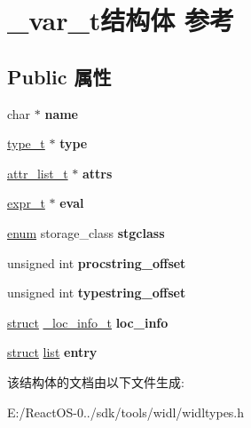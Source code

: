 \hypertarget{struct__var__t}{}\section{\+\_\+var\+\_\+t结构体 参考}
\label{struct__var__t}
\subsection*{Public 属性}
\begin{DoxyCompactItemize}
\item 
\mbox{\label{struct__var__t_a0b690bbf506b5e6ad9f3d3c79602a028}} 
char $\ast$ {\bfseries name}
\item 
\mbox{\label{struct__var__t_a0aa23f34dd67d227583185602d967ec6}} 
\hyperlink{struct__type__t}{type\+\_\+t} $\ast$ {\bfseries type}
\item 
\mbox{\label{struct__var__t_a53ce9198a7d9e16f01ee8183a63a18d9}} 
\hyperlink{classlist}{attr\+\_\+list\+\_\+t} $\ast$ {\bfseries attrs}
\item 
\mbox{\label{struct__var__t_acc456e339dda6c2b4cbda3f67fb29e2f}} 
\hyperlink{struct__expr__t}{expr\+\_\+t} $\ast$ {\bfseries eval}
\item 
\mbox{\label{struct__var__t_acbd2b0014934f52aef913d7401915fdc}} 
\hyperlink{interfaceenum}{enum} storage\+\_\+class {\bfseries stgclass}
\item 
\mbox{\label{struct__var__t_a3701825e0cd0f6668f08dd26e7ab8d66}} 
unsigned int {\bfseries procstring\+\_\+offset}
\item 
\mbox{\label{struct__var__t_a6dcc63881376b975d737f5d2cbce8258}} 
unsigned int {\bfseries typestring\+\_\+offset}
\item 
\mbox{\label{struct__var__t_a19ae209d6f8bb145ead6c76e754b23fd}} 
\hyperlink{interfacestruct}{struct} \hyperlink{struct__loc__info__t}{\+\_\+loc\+\_\+info\+\_\+t} {\bfseries loc\+\_\+info}
\item 
\mbox{\label{struct__var__t_a0aa3c5dadbd2a69c29c4f242abf0b5d8}} 
\hyperlink{interfacestruct}{struct} \hyperlink{classlist}{list} {\bfseries entry}
\end{DoxyCompactItemize}


该结构体的文档由以下文件生成\+:\begin{DoxyCompactItemize}
\item 
E\+:/\+React\+O\+S-\/0../sdk/tools/widl/widltypes.\+h\end{DoxyCompactItemize}
